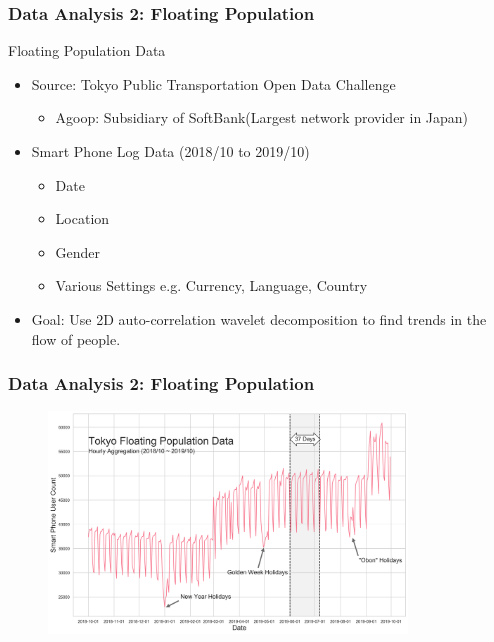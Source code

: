 \documentclass[aspectratio=169]{beamer}
\begin{document}
\begin{frame}
\frametitle{Data Analysis 2: Floating Population}
Floating Population Data
\begin{itemize}
    \item Source: Tokyo Public Transportation Open Data Challenge
    \begin{itemize}
        \item Agoop: Subsidiary of SoftBank(Largest network provider in Japan)
    \end{itemize}
    \item Smart Phone Log Data (2018/10 to 2019/10)
    \begin{itemize}
        \item Date
        \item Location
        \item Gender
        \item Various Settings e.g. Currency, Language, Country
    \end{itemize}
    \item Goal: Use 2D auto-correlation wavelet decomposition to find trends in the flow of people.
\end{itemize}
\end{frame}

\begin{frame}
\frametitle{Data Analysis 2: Floating Population}
    \begin{figure}
        \centering
        \includegraphics[height=0.85\textheight,width=0.85\textwidth]{images/Tokyo Float Pop Data.png}
    \end{figure}
\end{frame}
\end{document}

